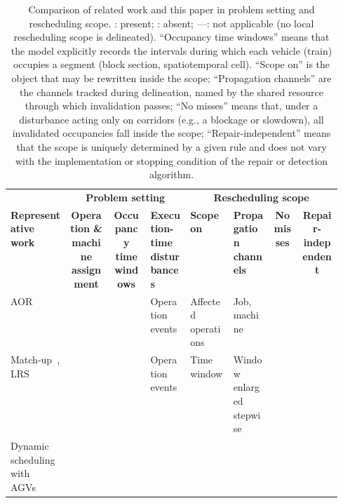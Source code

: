 \documentclass[manuscript,screen,review]{acmart}
\newcommand{\cmark}{\ding{51}}
\newcommand{\xmark}{\ding{55}}
\begin{document}
\label{sec:rw_claim}
\begin{table}[t]
\centering
\caption{Comparison of related work and this paper in problem setting and rescheduling scope.
\cmark: present; \xmark: absent; ---: not applicable (no local rescheduling scope is delineated).
``Occupancy time windows'' means that the model explicitly records the intervals during which each vehicle (train) occupies a segment (block section, spatiotemporal cell).
``Scope on'' is the object that may be rewritten inside the scope;
``Propagation channels'' are the channels tracked during delineation, named by the shared resource through which invalidation passes;
``No misses'' means that, under a disturbance acting only on corridors (e.g., a blockage or slowdown), all invalidated occupancies fall inside the scope;
``Repair-independent'' means that the scope is uniquely determined by a given rule and does not vary with the implementation or stopping condition of the repair or detection algorithm.}
\label{tab:position}
\footnotesize
\setlength{\tabcolsep}{3pt}
\begin{tabular}{@{}>{\raggedright\arraybackslash}p{0.18\linewidth}cc>{\raggedright\arraybackslash}p{0.12\linewidth}>{\raggedright\arraybackslash}p{0.13\linewidth}>{\raggedright\arraybackslash}p{0.12\linewidth}cc@{}}
\toprule
& \multicolumn{3}{c}{\textbf{Problem setting}} & \multicolumn{4}{c}{\textbf{Rescheduling scope}} \\
\cmidrule(lr){2-4}\cmidrule(l){5-8}
\textbf{Representative work} &
\makecell{\textbf{Operation \&}\\\textbf{machine}\\\textbf{assignment}} &
\makecell{\textbf{Occupancy}\\\textbf{time}\\\textbf{windows}} &
\textbf{Execution-time disturbances} &
\textbf{Scope on} &
\textbf{Propagation channels} &
\makecell{\textbf{No}\\\textbf{misses}} &
\makecell{\textbf{Repair-}\\\textbf{independent}} \\
\midrule
AOR~\cite{subramaniam2003maor} &
\cmark & \xmark & Operation events & Affected operations & Job, machine & \xmark & \cmark \\
Match-up~\cite{qiao2012single,salido2017rescheduling}, LRS~\cite{kuster2007local} &
\cmark & \xmark & Operation events & Time window & Window enlarged stepwise & \xmark & \xmark \\
Dynamic scheduling with AGVs~\cite{zhang2023energy,tang2026dynamic} &

\end{tabular}
\end{table}
\end{document}
